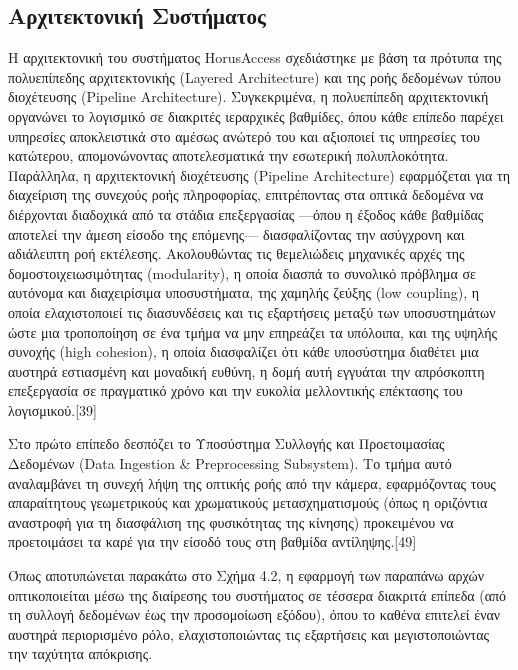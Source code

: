 \documentclass[twoside, a4paper, 11pt]{article}
\begin{document}
\subsection{Αρχιτεκτονική Συστήματος}
Η αρχιτεκτονική του συστήματος HorusAccess σχεδιάστηκε με βάση τα πρότυπα της πολυεπίπεδης αρχιτεκτονικής (Layered Architecture) και της ροής δεδομένων τύπου διοχέτευσης (Pipeline Architecture). Συγκεκριμένα, η πολυεπίπεδη αρχιτεκτονική οργανώνει το λογισμικό σε διακριτές ιεραρχικές βαθμίδες, όπου κάθε επίπεδο παρέχει υπηρεσίες αποκλειστικά στο αμέσως ανώτερό του και αξιοποιεί τις υπηρεσίες του κατώτερου, απομονώνοντας αποτελεσματικά την εσωτερική πολυπλοκότητα. Παράλληλα, η αρχιτεκτονική διοχέτευσης (Pipeline Architecture) εφαρμόζεται για τη διαχείριση της συνεχούς ροής πληροφορίας, επιτρέποντας στα οπτικά δεδομένα να διέρχονται διαδοχικά από τα στάδια επεξεργασίας —όπου η έξοδος κάθε βαθμίδας αποτελεί την άμεση είσοδο της επόμενης— διασφαλίζοντας την ασύγχρονη και αδιάλειπτη ροή εκτέλεσης. Ακολουθώντας τις θεμελιώδεις μηχανικές αρχές της δομοστοιχειωσιμότητας (modularity), η οποία διασπά το συνολικό πρόβλημα σε αυτόνομα και διαχειρίσιμα υποσυστήματα, της χαμηλής ζεύξης (low coupling), η οποία ελαχιστοποιεί τις διασυνδέσεις και τις εξαρτήσεις μεταξύ των υποσυστημάτων ώστε μια τροποποίηση σε ένα τμήμα να μην επηρεάζει τα υπόλοιπα, και της υψηλής συνοχής (high cohesion), η οποία διασφαλίζει ότι κάθε υποσύστημα διαθέτει μια αυστηρά εστιασμένη και μοναδική ευθύνη, η δομή αυτή εγγυάται την απρόσκοπτη επεξεργασία σε πραγματικό χρόνο και την ευκολία μελλοντικής επέκτασης του λογισμικού.[39]

Στο πρώτο επίπεδο δεσπόζει το Υποσύστημα Συλλογής και Προετοιμασίας Δεδομένων (Data Ingestion \& Preprocessing Subsystem). Το τμήμα αυτό αναλαμβάνει τη συνεχή λήψη της οπτικής ροής από την κάμερα, εφαρμόζοντας τους απαραίτητους γεωμετρικούς και χρωματικούς μετασχηματισμούς (όπως η οριζόντια αναστροφή για τη διασφάλιση της φυσικότητας της κίνησης) προκειμένου να προετοιμάσει τα καρέ για την είσοδό τους στη βαθμίδα αντίληψης.[49]

Όπως αποτυπώνεται παρακάτω στο Σχήμα 4.2, η εφαρμογή των παραπάνω αρχών οπτικοποιείται μέσω της διαίρεσης του συστήματος σε τέσσερα διακριτά επίπεδα (από τη συλλογή δεδομένων έως την προσομοίωση εξόδου), όπου το καθένα επιτελεί έναν αυστηρά περιορισμένο ρόλο, ελαχιστοποιώντας τις εξαρτήσεις και μεγιστοποιώντας την ταχύτητα απόκρισης.
\end{document}
